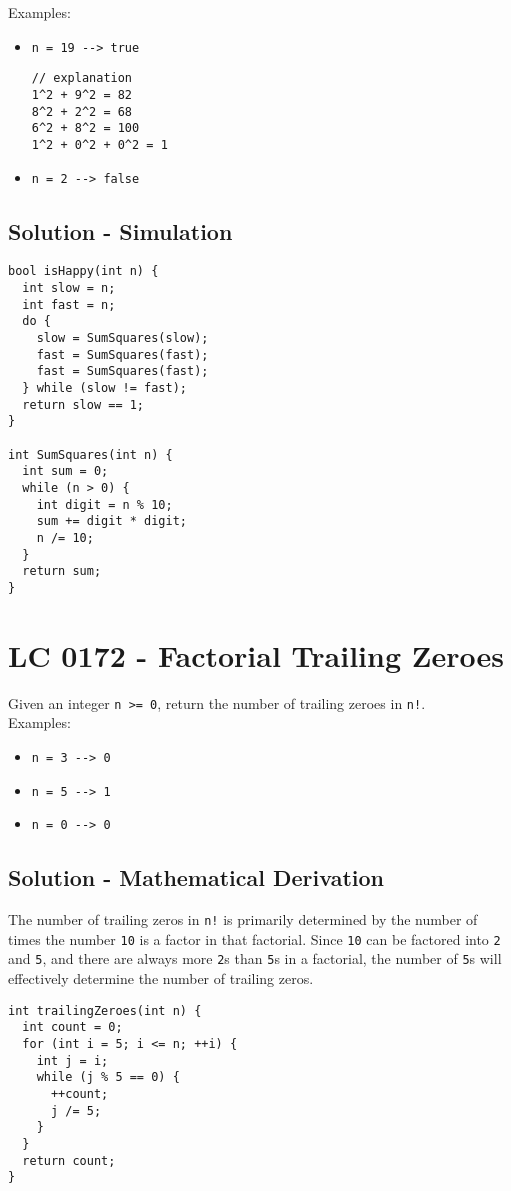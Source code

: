 Examples:
\begin{itemize}
	\item {\colorbox{CodeBackground}{\lstinline|n = 19 --> true|}}
\begin{lstlisting}
// explanation
1^2 + 9^2 = 82
8^2 + 2^2 = 68
6^2 + 8^2 = 100
1^2 + 0^2 + 0^2 = 1
\end{lstlisting}
	\item {\colorbox{CodeBackground}{\lstinline|n = 2 --> false|}}
\end{itemize}

\subsection*{Solution - Simulation}
\begin{lstlisting}
bool isHappy(int n) {
  int slow = n;
  int fast = n;
  do {
    slow = SumSquares(slow);
    fast = SumSquares(fast);
    fast = SumSquares(fast);
  } while (slow != fast);
  return slow == 1;
}

int SumSquares(int n) {
  int sum = 0;
  while (n > 0) {
    int digit = n % 10;
    sum += digit * digit;
    n /= 10;
  }
  return sum;
}
\end{lstlisting}

\section{LC 0172 - Factorial Trailing Zeroes}
Given an integer {\colorbox{CodeBackground}{\lstinline|n >= 0|}}, return the number of trailing zeroes in {\colorbox{CodeBackground}{\lstinline|n!|}}.\\

Examples:
\begin{itemize}
\item {\colorbox{CodeBackground}{\lstinline|n = 3 --> 0|}}
\item {\colorbox{CodeBackground}{\lstinline|n = 5 --> 1|}}
\item {\colorbox{CodeBackground}{\lstinline|n = 0 --> 0|}}
\end{itemize}

\subsection*{Solution - Mathematical Derivation}
The number of trailing zeros in {\colorbox{CodeBackground}{\lstinline|n!|}} is primarily determined by the number of times the number {\colorbox{CodeBackground}{\lstinline|10|}} is a factor in that factorial. Since {\colorbox{CodeBackground}{\lstinline|10|}} can be factored into {\colorbox{CodeBackground}{\lstinline|2|}} and {\colorbox{CodeBackground}{\lstinline|5|}}, and there are always more {\colorbox{CodeBackground}{\lstinline|2|}}s than {\colorbox{CodeBackground}{\lstinline|5|}}s in a factorial, the number of {\colorbox{CodeBackground}{\lstinline|5|}}s will effectively determine the number of trailing zeros.
\begin{lstlisting}
int trailingZeroes(int n) {
  int count = 0;
  for (int i = 5; i <= n; ++i) {
    int j = i;
    while (j % 5 == 0) {
      ++count;
      j /= 5;
    }
  }
  return count;
}
\end{lstlisting}

